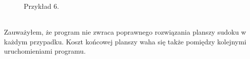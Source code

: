 \documentclass{article}
\begin{document}
        \begin{figure}[h!]
            \centering
            \caption{Przykład 6.}
        \end{figure}\\
        
        \FloatBarrier 
        Zauważyłem, że program nie zwraca poprawnego rozwiązania planszy sudoku w każdym przypadku. Koszt końcowej planszy waha się także pomiędzy kolejnymi uruchomieniami programu. 
\end{document}
